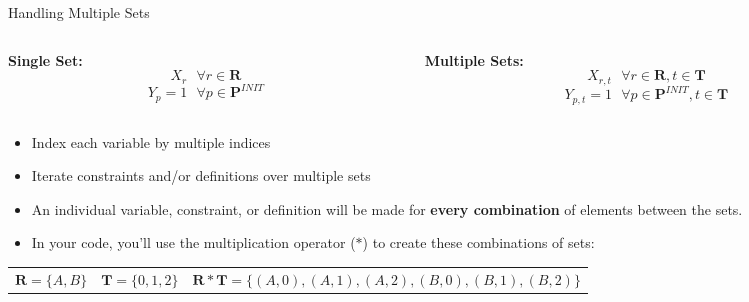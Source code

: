 \documentclass[10pt, aspectratio=169]{beamer}
\begin{document}
\begin{frame}{Handling Multiple Sets}
    \begin{columns}
        \begin{column}{0.5\textwidth}
            \begin{center}
                \textbf{Single Set:}
                $$X_r \ \ \ \forall r \in \textbf{R}$$
                $$Y_p = 1 \ \ \ \forall p \in \textbf{P}^{INIT}$$
            \end{center}
        \end{column}
        \begin{column}{0.5\textwidth}
            \begin{center}
                \textbf{Multiple Sets:}
                $$X_{r,t} \ \ \ \forall r \in \textbf{R}, t \in \textbf{T}$$
                $$Y_{p,t} = 1 \ \ \ \forall p \in \textbf{P}^{INIT}, t \in \textbf{T}$$
            \end{center}
        \end{column}
    \end{columns}
    \vspace{1 cm}
    \begin{itemize}
        \item Index each variable by multiple indices
        \item Iterate constraints and/or definitions over multiple sets
        \item An individual variable, constraint, or definition will be made for \textbf{every combination} of elements between the sets.
        \item In your code, you'll use the multiplication operator ($*$) to create these combinations of sets:
    \end{itemize}

    \begin{tabular}{c c c }
        $\textbf{R} = \{A,B\}$ & $\textbf{T} = \{0,1,2\}$ & $\textbf{R} * \textbf{T} = \{(A,0),(A,1),(A,2),(B,0),(B,1),(B,2)\}$\\
    \end{tabular}
\end{frame}
\end{document}
